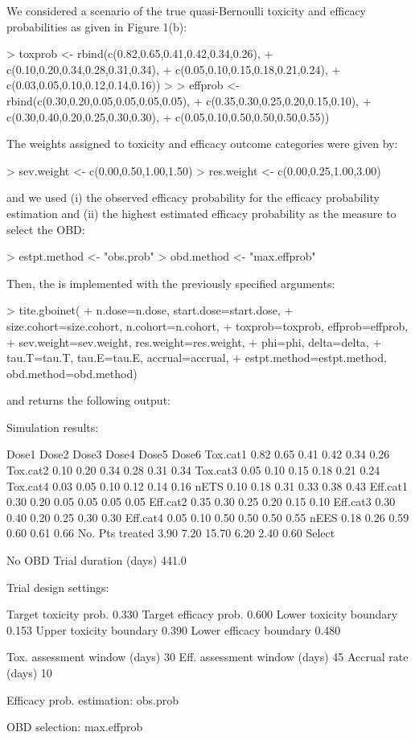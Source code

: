 We considered a scenario of the true quasi-Bernoulli toxicity and efficacy probabilities as given in Figure 1(b):
\begin{example}
> toxprob <- rbind(c(0.82,0.65,0.41,0.42,0.34,0.26),
+                  c(0.10,0.20,0.34,0.28,0.31,0.34),
+                  c(0.05,0.10,0.15,0.18,0.21,0.24),
+                  c(0.03,0.05,0.10,0.12,0.14,0.16))
> 
> effprob <- rbind(c(0.30,0.20,0.05,0.05,0.05,0.05),
+                  c(0.35,0.30,0.25,0.20,0.15,0.10),
+                  c(0.30,0.40,0.20,0.25,0.30,0.30),
+                  c(0.05,0.10,0.50,0.50,0.50,0.55))
\end{example}
The weights assigned to toxicity and efficacy outcome categories were given by:
\begin{example}
> sev.weight <- c(0.00,0.50,1.00,1.50)
> res.weight <- c(0.00,0.25,1.00,3.00)
\end{example}
and we used (i) the observed efficacy probability for the efficacy probability estimation and (ii) the highest estimated efficacy probability as the measure to select the OBD:
\begin{example}
> estpt.method <- "obs.prob"
> obd.method   <- "max.effprob"
\end{example}
Then, the  is implemented with the previously specified arguments:
\begin{example}
> tite.gboinet(
+   n.dose=n.dose, start.dose=start.dose,
+   size.cohort=size.cohort, n.cohort=n.cohort,
+   toxprob=toxprob, effprob=effprob,
+   sev.weight=sev.weight, res.weight=res.weight,
+   phi=phi, delta=delta,
+   tau.T=tau.T, tau.E=tau.E, accrual=accrual,
+   estpt.method=estpt.method, obd.method=obd.method)
\end{example}
and returns the following output:
\begin{example}
Simulation results:

                 Dose1  Dose2  Dose3  Dose4  Dose5  Dose6
Tox.cat1          0.82   0.65   0.41   0.42   0.34   0.26
Tox.cat2          0.10   0.20   0.34   0.28   0.31   0.34
Tox.cat3          0.05   0.10   0.15   0.18   0.21   0.24
Tox.cat4          0.03   0.05   0.10   0.12   0.14   0.16
nETS              0.10   0.18   0.31   0.33   0.38   0.43
Eff.cat1          0.30   0.20   0.05   0.05   0.05   0.05
Eff.cat2          0.35   0.30   0.25   0.20   0.15   0.10
Eff.cat3          0.30   0.40   0.20   0.25   0.30   0.30
Eff.cat4          0.05   0.10   0.50   0.50   0.50   0.55
nEES              0.18   0.26   0.59   0.60   0.61   0.66
No. Pts treated   3.90   7.20  15.70   6.20   2.40   0.60
Select %

No OBD %
Trial duration (days)  441.0

Trial design settings:

Target toxicity prob.    0.330
Target efficacy prob.    0.600
Lower toxicity boundary  0.153
Upper toxicity boundary  0.390
Lower efficacy boundary  0.480

Tox. assessment window (days)  30
Eff. assessment window (days)  45
Accrual rate (days)            10

Efficacy prob. estimation: obs.prob

OBD selection: max.effprob
\end{example}
